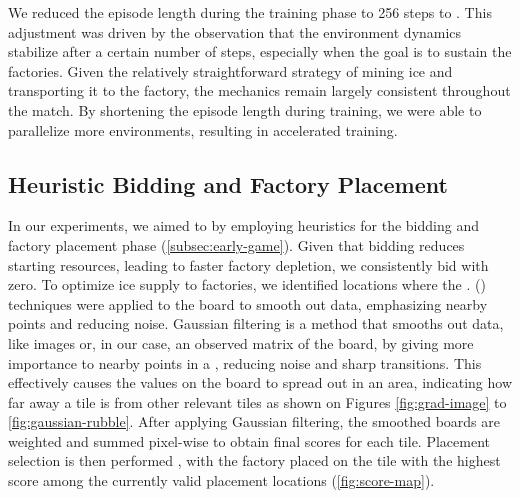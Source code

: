 \bigskip

\noindent We reduced the episode length during the training phase to 256 steps to . This adjustment was driven by the observation that the environment dynamics stabilize after a certain number of steps, especially when the goal is to sustain the factories. Given the relatively straightforward strategy of mining ice and transporting it to the factory, the mechanics remain largely consistent throughout the match. By shortening the episode length during training, we were able to parallelize more environments, resulting in accelerated training.

\subsection{Heuristic Bidding and Factory Placement}
\label{subsec:heur-bidding-factory}

\noindent In our experiments, we aimed to   by employing heuristics for the bidding and factory placement phase (\autoref{subsec:early-game}). Given that bidding reduces starting resources, leading to faster factory depletion, we consistently bid with zero. To optimize ice supply to factories, we identified locations where the .  (\cite{gaussianfilter}) techniques were applied to the board to smooth out data, emphasizing nearby points and reducing noise. Gaussian filtering is a method that smooths out data, like images or, in our case, an observed matrix of the board, by giving more importance to nearby points in a , reducing noise and sharp transitions. This effectively causes the values on the board to spread out in an area, indicating how far away a tile is from other relevant tiles  as shown on Figures \ref{fig:grad-image} to \ref{fig:gaussian-rubble}. After applying Gaussian filtering, the smoothed boards are weighted and summed pixel-wise to obtain final scores for each tile. Placement selection is then performed , with the factory placed on the tile with the highest score among the currently valid placement locations (\autoref{fig:score-map}).


